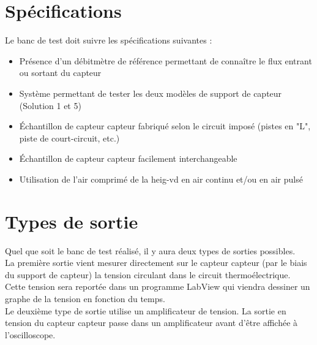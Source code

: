 
\section{Spécifications}
Le banc de test doit suivre les spécifications suivantes :
\begin{itemize}
    \item Présence d'un débitmètre de référence permettant de connaître le flux entrant ou sortant du capteur
    \item Système permettant de tester les deux modèles de support de capteur (Solution 1 et 5)
    \item Échantillon de capteur \gls{capteur} fabriqué selon le circuit imposé (pistes en "L", piste de court-circuit, etc.)
    \item Échantillon de capteur \gls{capteur} facilement interchangeable
    \item Utilisation de l'air comprimé de la \gls{heig-vd} en air continu et/ou en air pulsé
\end{itemize}

\section{Types de sortie}
Quel que soit le banc de test réalisé, il y aura deux types de sorties possibles. \\

La première sortie vient mesurer directement sur le capteur 
\gls{capteur} (par le biais du support de capteur) la tension circulant dans le circuit thermoélectrique. Cette tension sera reportée dans un 
programme LabView qui viendra dessiner un graphe de la tension en fonction du temps. \\

Le deuxième type de sortie utilise un amplificateur de tension. La sortie en tension du capteur \gls{capteur} passe dans un amplificateur avant 
d'être affichée à l'oscilloscope. 



